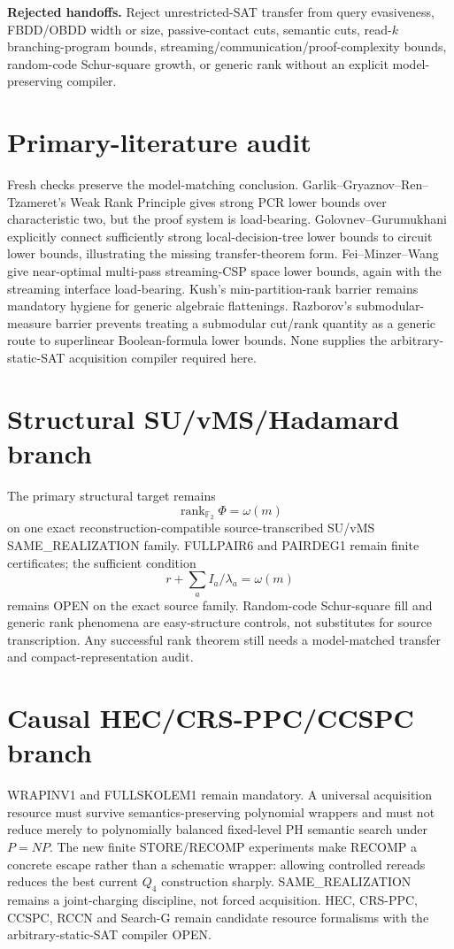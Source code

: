 \documentclass[11pt]{article}
\begin{document}
\textbf{Rejected handoffs.}
Reject unrestricted-SAT transfer from query evasiveness, FBDD/OBDD width or size, passive-contact cuts, semantic cuts, read-\(k\) branching-program bounds, streaming/communication/proof-complexity bounds, random-code Schur-square growth, or generic rank without an explicit model-preserving compiler.

\section*{Primary-literature audit}
Fresh checks preserve the model-matching conclusion. Garlik--Gryaznov--Ren--Tzameret's Weak Rank Principle gives strong PCR lower bounds over characteristic two, but the proof system is load-bearing. Golovnev--Gurumukhani explicitly connect sufficiently strong local-decision-tree lower bounds to circuit lower bounds, illustrating the missing transfer-theorem form. Fei--Minzer--Wang give near-optimal multi-pass streaming-CSP space lower bounds, again with the streaming interface load-bearing. Kush's min-partition-rank barrier remains mandatory hygiene for generic algebraic flattenings. Razborov's submodular-measure barrier prevents treating a submodular cut/rank quantity as a generic route to superlinear Boolean-formula lower bounds. None supplies the arbitrary-static-SAT acquisition compiler required here.

\section*{Structural SU/vMS/Hadamard branch}
The primary structural target remains
\[
\boxed{\operatorname{rank}_{\mathbb F_2}\Phi=\omega(m)}
\]
on one exact reconstruction-compatible source-transcribed SU/vMS SAME\_REALIZATION family. FULLPAIR6 and PAIRDEG1 remain finite certificates; the sufficient condition
\[
r+\sum_a I_a/\lambda_a=\omega(m)
\]
remains OPEN on the exact source family. Random-code Schur-square fill and generic rank phenomena are easy-structure controls, not substitutes for source transcription. Any successful rank theorem still needs a model-matched transfer and compact-representation audit.

\section*{Causal HEC/CRS-PPC/CCSPC branch}
WRAPINV1 and FULLSKOLEM1 remain mandatory. A universal acquisition resource must survive semantics-preserving polynomial wrappers and must not reduce merely to polynomially balanced fixed-level PH semantic search under \(P=NP\). The new finite STORE/RECOMP experiments make RECOMP a concrete escape rather than a schematic wrapper: allowing controlled rereads reduces the best current \(Q_4\) construction sharply. SAME\_REALIZATION remains a joint-charging discipline, not forced acquisition. HEC, CRS-PPC, CCSPC, RCCN and Search-G remain candidate resource formalisms with the arbitrary-static-SAT compiler OPEN.
\end{document}
